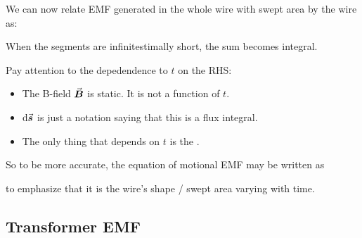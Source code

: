 \documentclass[class=article, crop=false, 12pt]{standalone}
\begin{document}

We can now relate EMF generated in the whole wire with swept area by the wire as:

When the segments are infinitestimally short, the sum becomes integral.

Pay attention to the depedendence to $t$ on the RHS:
\begin{itemize}
    \item The B-field $\va*{B}$ is static. It is not a function of $t$.
    
    \item $\dd{\va*{s}}$ is just a notation saying that this is a flux integral. 

    \item The only thing that depends on $t$ is the .
\end{itemize}

So to be more accurate, the equation of motional EMF may be written as 

to emphasize that it is the wire's shape / swept area varying with time.



\subsection{Transformer EMF}
\end{document}
